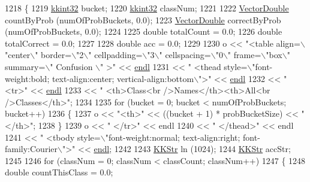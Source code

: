 \begin{DoxyCode}
1218 \{
1219   \hyperlink{namespace_k_k_b_a8fa4952cc84fda1de4bec1fbdd8d5b1b}{kkint32} bucket;
1220   \hyperlink{namespace_k_k_b_a8fa4952cc84fda1de4bec1fbdd8d5b1b}{kkint32} classNum;
1221 
1222   \hyperlink{namespace_k_k_b_a5906c207479607e5f450434095914a41}{VectorDouble} countByProb   (numOfProbBuckets, 0.0);
1223   \hyperlink{namespace_k_k_b_a5906c207479607e5f450434095914a41}{VectorDouble} correctByProb (numOfProbBuckets, 0.0);
1224 
1225   \textcolor{keywordtype}{double}  totalCount   = 0.0;
1226   \textcolor{keywordtype}{double}  totalCorrect = 0.0;
1227 
1228   \textcolor{keywordtype}{double}  acc = 0.0;
1229 
1230   o << \textcolor{stringliteral}{"<table align=\(\backslash\)"center\(\backslash\)" border=\(\backslash\)"2\(\backslash\)" cellpadding=\(\backslash\)"3\(\backslash\)" cellspacing=\(\backslash\)"0\(\backslash\)" frame=\(\backslash\)"box\(\backslash\)"  summary=\(\backslash\)"
      Confusion \(\backslash\)" >"} << \hyperlink{namespace_k_k_b_ad1f50f65af6adc8fa9e6f62d007818a8}{endl}
1231     << \textcolor{stringliteral}{"  <thead style=\(\backslash\)"font-weight:bold; text-align:center; vertical-align:bottom\(\backslash\)">"}          << 
      \hyperlink{namespace_k_k_b_ad1f50f65af6adc8fa9e6f62d007818a8}{endl}
1232     << \textcolor{stringliteral}{"    <tr>"}                                                                                << 
      \hyperlink{namespace_k_k_b_ad1f50f65af6adc8fa9e6f62d007818a8}{endl}
1233     << \textcolor{stringliteral}{"        <th>Class<br />Names</th><th>All<br />Classes</th>"};
1234 
1235   \textcolor{keywordflow}{for}  (bucket = 0;  bucket < numOfProbBuckets;  bucket++)
1236   \{
1237     o << \textcolor{stringliteral}{"<th>"} << ((bucket + 1) * probBucketSize) << \textcolor{stringliteral}{"</th>"};
1238   \}
1239   o << \textcolor{stringliteral}{"    </tr>"}                                                                               << endl
1240     << \textcolor{stringliteral}{"  </thead>"}                                                                              << endl
1241     << \textcolor{stringliteral}{"  <tbody style=\(\backslash\)"font-weight:normal; text-align:right; font-family:Courier\(\backslash\)">"} << 
      \hyperlink{namespace_k_k_b_ad1f50f65af6adc8fa9e6f62d007818a8}{endl};
1242 
1243   \hyperlink{class_k_k_b_1_1_k_k_str}{KKStr}  ln (1024);
1244   \hyperlink{class_k_k_b_1_1_k_k_str}{KKStr}  accStr;
1245 
1246   \textcolor{keywordflow}{for}  (classNum = 0;  classNum < classCount;  classNum++)
1247   \{
1248     \textcolor{keywordtype}{double}  countThisClass   = 0.0;

\end{DoxyCode}
